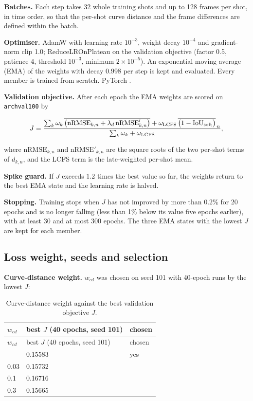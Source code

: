 \documentclass[11pt,a4paper]{article}
\numberwithin{equation}{section}
\begin{document}
\textbf{Batches.} Each step takes 32 whole training shots and up to 128 frames per shot, in time order, so that the per-shot curve distance and the frame differences are defined within the batch.

\textbf{Optimiser.} AdamW \cite{loshchilov2019} with learning rate \(10^{-3}\), weight decay \(10^{-4}\) and gradient-norm clip 1.0; ReduceLROnPlateau on the validation objective (factor 0.5, patience 4, threshold \(10^{-3}\), minimum \(2\times10^{-5}\)). An exponential moving average (EMA) of the weights with decay 0.998 per step is kept and evaluated. Every member is trained from scratch. PyTorch \cite{paszke2019}.

\textbf{Validation objective.} After each epoch the EMA weights are scored on \texttt{archval100} by

\[
J = \frac{\sum_k\omega_k\,\overline{\big(\mathrm{nRMSE}_{k,n}+\lambda_d\,\mathrm{nRMSE}'_{k,n}\big)}
 + \omega_{\rm LCFS}\,\overline{\big(1-\mathrm{IoU}_{\rm soft}\big)}_{\,n}}{\sum_k\omega_k+\omega_{\rm LCFS}},
\]

where \(\mathrm{nRMSE}_{k,n}\) and \(\mathrm{nRMSE}'_{k,n}\) are the square roots of the two per-shot terms of \(d_{k,n}\), and the LCFS term is the late-weighted per-shot mean.

\textbf{Spike guard.} If \(J\) exceeds 1.2 times the best value so far, the weights return to the best EMA state and the learning rate is halved.

\textbf{Stopping.} Training stops when \(J\) has not improved by more than 0.2\% for 20 epochs and is no longer falling (less than 1\% below its value five epochs earlier), with at least 30 and at most 300 epochs. The three EMA states with the lowest \(J\) are kept for each member.

\hypertarget{loss-weight-seeds-and-selection}{%
\subsection{Loss weight, seeds and selection}\label{loss-weight-seeds-and-selection}}

\textbf{Curve-distance weight.} \(w_{cd}\) was chosen on seed 101 with 40-epoch runs by the lowest \(J\):

\begin{longtable}[]{@{}lll@{}}
\caption{Curve-distance weight against the best validation objective \(J\).}\tabularnewline
\toprule\noalign{}
\(w_{cd}\) & best \(J\) (40 epochs, seed 101) & chosen \\
\midrule\noalign{}
\endfirsthead
\toprule\noalign{}
\(w_{cd}\) & best \(J\) (40 epochs, seed 101) & chosen \\
\midrule\noalign{}
\endhead
\bottomrule\noalign{}
\endlastfoot
0.01 & 0.15583 & yes \\
0.03 & 0.15732 & \\
0.1 & 0.16716 & \\
0.3 & 0.15665 & \\
\end{longtable}
\end{document}
